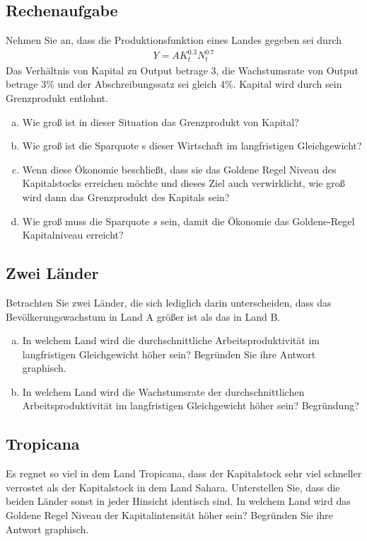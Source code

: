 \documentclass{scrartcl}
\begin{document}
\subsection{Rechenaufgabe}
Nehmen Sie an, dass die Produktionsfunktion eines Landes gegeben sei durch
\begin{align*}
  Y = AK_t^{0.3}N_t^{0.7}
\end{align*}
Das Verh\"{a}ltnis von Kapital zu Output betrage 3, die Wachstumsrate von Output betrage 3\% und der Abschreibungssatz sei gleich 4\%. Kapital wird durch sein Grenzprodukt entlohnt.
\begin{enumerate}[(a)]
  \item Wie gro{\ss} ist in dieser Situation das Grenzprodukt von Kapital?
  \item Wie gro{\ss} ist die Sparquote s dieser Wirtschaft im langfristigen Gleichgewicht?
  \item Wenn diese \"{O}konomie beschlie{\ss}t, dass sie das Goldene Regel Niveau des Kapitalstocks erreichen m\"{o}chte und dieses Ziel auch verwirklicht, wie gro{\ss} wird dann das Grenzprodukt des Kapitals sein?
  \item Wie gro{\ss} muss die Sparquote $s$ sein, damit die \"{O}konomie das Goldene-Regel Kapitalniveau erreicht?
\end{enumerate}
\subsection{Zwei L\"{a}nder}
Betrachten Sie zwei L\"{a}nder, die sich lediglich darin unterscheiden, dass das Bev\"{o}lkerungswachstum in Land A gr\"{o}{\ss}er ist als das in Land B.
\begin{enumerate}[(a)]
  \item In welchem Land wird die durchschnittliche Arbeitsproduktivit\"{a}t im langfristigen Gleichgewicht h\"{o}her sein? Begr\"{u}nden Sie ihre Antwort graphisch.
  \item In welchem Land wird die Wachstumsrate der durchschnittlichen Arbeitsproduktivit\"{a}t im langfristigen Gleichgewicht h\"{o}her sein? Begr\"{u}ndung?
\end{enumerate}
\subsection{Tropicana}
Es regnet so viel in dem Land Tropicana, dass der Kapitalstock sehr viel schneller verrostet als der Kapitalstock in dem Land Sahara. Unterstellen Sie, dass die beiden L\"{a}nder sonst in jeder Hinsicht identisch sind. In welchem Land wird das Goldene Regel Niveau der Kapitalintensit\"{a}t h\"{o}her sein? Begr\"{u}nden Sie ihre Antwort graphisch.
\end{document}
